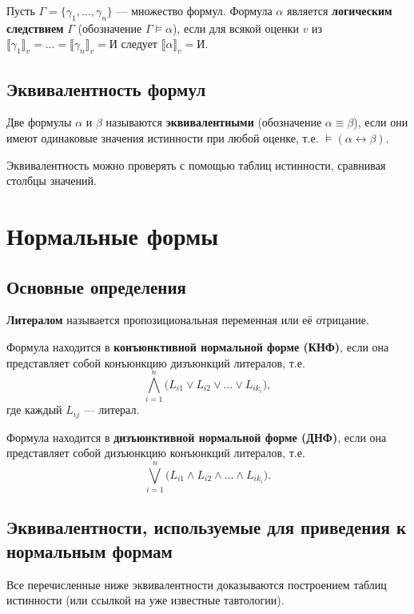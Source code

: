 \documentclass[10pt]{article}
\begin{document}
\begin{definition}
Пусть \(\Gamma = \{\gamma_1,\dots,\gamma_n\}\) — множество формул. Формула \(\alpha\) является \textbf{логическим следствием} \(\Gamma\) (обозначение \(\Gamma \models \alpha\)), если для всякой оценки \(v\) из \(\llbracket\gamma_1\rrbracket_v = \dots = \llbracket\gamma_n\rrbracket_v = \textit{И}\) следует \(\llbracket\alpha\rrbracket_v = \textit{И}\).
\end{definition}

\subsection{Эквивалентность формул}
Две формулы \(\alpha\) и \(\beta\) называются \textbf{эквивалентными} (обозначение \(\alpha \equiv \beta\)), если они имеют одинаковые значения истинности при любой оценке, т.е. \(\models (\alpha \leftrightarrow \beta)\).

Эквивалентность можно проверять с помощью таблиц истинности, сравнивая столбцы значений.

\section{Нормальные формы}

\subsection{Основные определения}
\begin{definition}
\textbf{Литералом} называется пропозициональная переменная или её отрицание.
\end{definition}

\begin{definition}
Формула находится в \textbf{конъюнктивной нормальной форме (КНФ)}, если она представляет собой конъюнкцию дизъюнкций литералов, т.е.
\[
\bigwedge_{i=1}^{n} \bigl( L_{i1} \lor L_{i2} \lor \dots \lor L_{ik_i} \bigr),
\]
где каждый \(L_{ij}\) — литерал.
\end{definition}

\begin{definition}
Формула находится в \textbf{дизъюнктивной нормальной форме (ДНФ)}, если она представляет собой дизъюнкцию конъюнкций литералов, т.е.
\[
\bigvee_{i=1}^{n} \bigl( L_{i1} \land L_{i2} \land \dots \land L_{ik_i} \bigr).
\]
\end{definition}

\subsection{Эквивалентности, используемые для приведения к нормальным формам}
Все перечисленные ниже эквивалентности доказываются построением таблиц истинности (или ссылкой на уже известные тавтологии).
\end{document}
